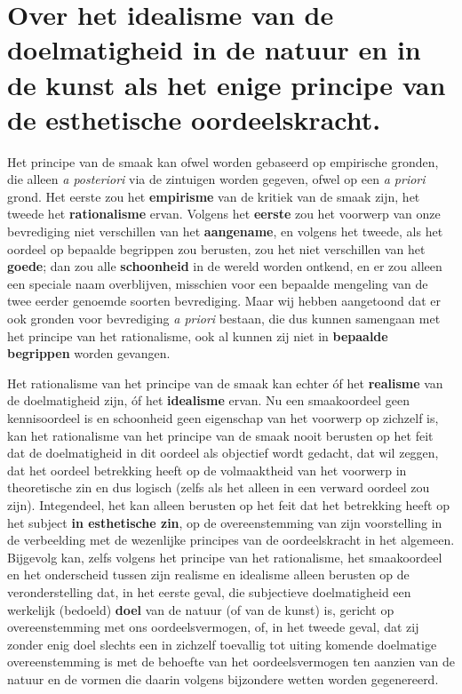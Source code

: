 \section{Over het idealisme van de doelmatigheid in de natuur en in de kunst als het enige principe van de esthetische oordeelskracht.}

Het principe van de smaak kan ofwel worden gebaseerd op empirische gronden, die alleen \textit{a posteriori} via de zintuigen worden gegeven, ofwel op een \textit{a priori} grond. Het eerste zou het \textbf{empirisme} van de kritiek van de smaak zijn, het tweede het \textbf{rationalisme} ervan. Volgens het \textbf{eerste} zou het voorwerp van onze bevrediging niet verschillen van het \textbf{aangename}, en volgens het tweede, als het oordeel op bepaalde begrippen zou berusten, zou het niet verschillen van het \textbf{goede}; dan zou alle \textbf{schoonheid} in de wereld worden ontkend, en er zou alleen een speciale naam overblijven, misschien voor een bepaalde mengeling van de twee eerder genoemde soorten bevrediging. Maar wij hebben aangetoond dat er ook gronden voor bevrediging \textit{a priori} bestaan, die dus kunnen samengaan met het principe van het rationalisme, ook al kunnen zij niet in \textbf{bepaalde begrippen} worden gevangen.

Het rationalisme van het principe van de smaak kan echter óf het \textbf{realisme} van de doelmatigheid zijn, óf het \textbf{idealisme} ervan. Nu een smaakoordeel geen kennisoordeel is en schoonheid geen eigenschap van het voorwerp op zichzelf is, kan het rationalisme van het principe van de smaak nooit berusten op het feit dat de doelmatigheid in dit oordeel als objectief wordt gedacht, dat wil zeggen, dat het oordeel betrekking heeft op de volmaaktheid van het voorwerp in theoretische zin en dus logisch (zelfs als het alleen in een verward oordeel zou zijn). Integendeel, het kan alleen berusten op het feit dat het betrekking heeft op het subject \textbf{in esthetische zin}, op de overeenstemming van zijn voorstelling in de verbeelding met de wezenlijke principes van de oordeelskracht in het algemeen. Bijgevolg kan, zelfs volgens het principe van het rationalisme, het smaakoordeel en het onderscheid tussen zijn realisme en idealisme alleen berusten op de veronderstelling dat, in het eerste geval, die subjectieve doelmatigheid een werkelijk (bedoeld) \textbf{doel} van de natuur (of van de kunst) is, gericht op overeenstemming met ons oordeelsvermogen, of, in het tweede geval, dat zij zonder enig doel slechts een in zichzelf toevallig tot uiting komende doelmatige overeenstemming is met de behoefte van het oordeelsvermogen ten aanzien van de natuur en de vormen die daarin volgens bijzondere wetten worden gegenereerd.

